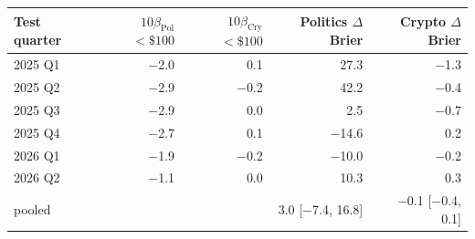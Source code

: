 \begin{tabular}{lrrrr}
\toprule
Test quarter & \thead{$10\beta_{\mathrm{Pol}}$\\$<\$100$} & \thead{$10\beta_{\mathrm{Cry}}$\\$<\$100$} & \thead{Politics\\$\Delta$Brier} & \thead{Crypto\\$\Delta$Brier} \\
\midrule
2025 Q1 & \ensuremath{-}2.0 & 0.1 & 27.3 & \ensuremath{-}1.3 \\
2025 Q2 & \ensuremath{-}2.9 & \ensuremath{-}0.2 & 42.2 & \ensuremath{-}0.4 \\
2025 Q3 & \ensuremath{-}2.9 & 0.0 & 2.5 & \ensuremath{-}0.7 \\
2025 Q4 & \ensuremath{-}2.7 & 0.1 & \ensuremath{-}14.6 & 0.2 \\
2026 Q1 & \ensuremath{-}1.9 & \ensuremath{-}0.2 & \ensuremath{-}10.0 & \ensuremath{-}0.2 \\
2026 Q2 & \ensuremath{-}1.1 & 0.0 & 10.3 & 0.3 \\
\midrule
pooled &  &  & 3.0 [\ensuremath{-}7.4, 16.8] & \ensuremath{-}0.1 [\ensuremath{-}0.4, 0.1] \\
\bottomrule
\end{tabular}
